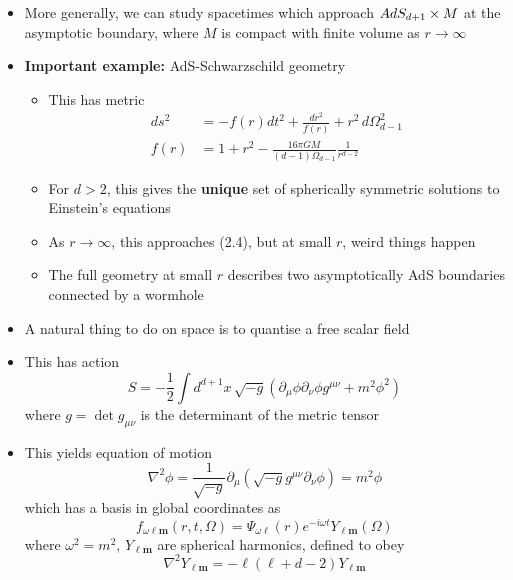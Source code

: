 \documentclass[12pt,a4paper]{article}
\numberwithin{equation}{section}
\begin{document}
\begin{itemize}
		\item More generally, we can study spacetimes which approach $AdS_{d+1}\times M$ at the asymptotic boundary, where $M$ is compact with finite volume as $r\to\infty$
		\item \textbf{Important example:} AdS-Schwarzschild geometry
		\begin{itemize}
			\item This has metric
			\begin{equation}
				\begin{aligned}
					ds^{2}&=-f(r)dt^{2}+\frac{dr^{2}}{f(r)}+r^{2}\,d\Omega_{d-1}^{2}\\
					f(r)&=1+r^{2}-\frac{16\pi GM}{(d-1)\Omega_{d-1}}\frac{1}{r^{d-2}}
				\end{aligned}
			\end{equation}
			\item For $d>2$, this gives the \textbf{unique} set of spherically symmetric solutions to Einstein's equations
			\item As $r\to \infty$, this approaches (2.4), but at small $r$, weird things happen
			\item The full geometry at small $r$ describes two asymptotically AdS boundaries connected by a wormhole
		\end{itemize}
		\item A natural thing to do on \ads space is to quantise a free scalar field
		\item This has action
		\begin{equation}
			S=-\frac{1}{2}\int d^{d+1}x\,\sqrt{-g}(\partial_{\mu}\phi\partial_{\nu}\phi g^{\mu\nu}+m^{2}\phi^{2})
		\end{equation}
		where $g=\det{g_{\mu\nu}}$ is the determinant of the metric tensor
		\item This yields equation of motion
		\begin{equation}
			\nabla^{2}\phi=\frac{1}{\sqrt{-g}}\partial_{\mu}\left(\sqrt{-g}g^{\mu\nu}\partial_{\nu}\phi\right)=m^{2}\phi
		\end{equation}
		which has a basis in global coordinates as
		\begin{equation}
			f_{\omega\ell\mathbf{m}}(r,t,\Omega)=\Psi_{\omega\ell}(r)e^{-i\omega t}Y_{\ell\mathbf{m}}(\Omega)
		\end{equation}
		where $\omega^{2}=m^{2}$, $Y_{\ell\mathbf{m}}$ are spherical harmonics, defined to obey
		\begin{equation}
			\nabla^{2}Y_{\ell\mathbf{m}}=-\ell(\ell+d-2)Y_{\ell\mathbf{m}}
		\end{equation}

\end{itemize}
\end{document}
